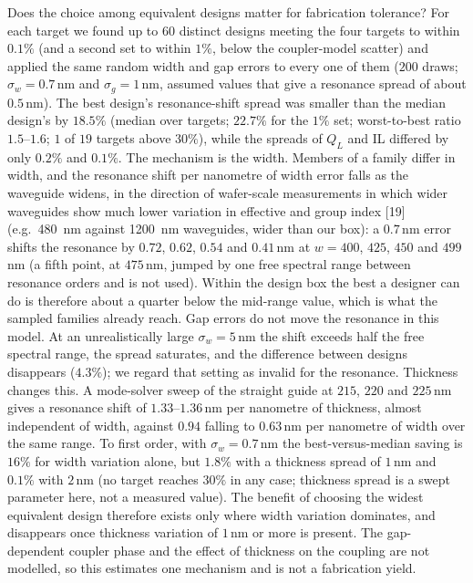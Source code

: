 \documentclass[11pt]{article}
\newcommand{\QL}{Q_L}
\begin{document}
Does the choice among equivalent designs matter for fabrication tolerance? For each target we found up to $60$ distinct designs meeting the four targets to within $0.1\%$ (and a second set to within $1\%$, below the coupler-model scatter) and applied the same random width and gap errors to every one of them ($200$ draws; $\sigma_w = 0.7$\,nm and $\sigma_g = 1$\,nm, assumed values that give a resonance spread of about $0.5$\,nm). The best design's resonance-shift spread was smaller than the median design's by $18.5\%$ (median over targets; $22.7\%$ for the $1\%$ set; worst-to-best ratio $1.5$--$1.6$; $1$ of $19$ targets above $30\%$), while the spreads of $\QL$ and IL differed by only $0.2\%$ and $0.1\%$. The mechanism is the width. Members of a family differ in width, and the resonance shift per nanometre of width error falls as the waveguide widens, in the direction of wafer-scale measurements in which wider waveguides show much lower variation in effective and group index [19] (e.g.\ \SI{480}{nm} against \SI{1200}{nm} waveguides, wider than our box): a $0.7$\,nm error shifts the resonance by $0.72$, $0.62$, $0.54$ and $0.41$\,nm at $w = 400$, $425$, $450$ and $499$\,nm (a fifth point, at $475$\,nm, jumped by one free spectral range between resonance orders and is not used). Within the design box the best a designer can do is therefore about a quarter below the mid-range value, which is what the sampled families already reach. Gap errors do not move the resonance in this model. At an unrealistically large $\sigma_w = 5$\,nm the shift exceeds half the free spectral range, the spread saturates, and the difference between designs disappears ($4.3\%$); we regard that setting as invalid for the resonance. Thickness changes this. A mode-solver sweep of the straight guide at $215$, $220$ and $225$\,nm gives a resonance shift of $1.33$--$1.36$\,nm per nanometre of thickness, almost independent of width, against $0.94$ falling to $0.63$\,nm per nanometre of width over the same range. To first order, with $\sigma_w = 0.7$\,nm the best-versus-median saving is $16\%$ for width variation alone, but $1.8\%$ with a thickness spread of $1$\,nm and $0.1\%$ with $2$\,nm (no target reaches $30\%$ in any case; thickness spread is a swept parameter here, not a measured value). The benefit of choosing the widest equivalent design therefore exists only where width variation dominates, and disappears once thickness variation of $1$\,nm or more is present. The gap-dependent coupler phase and the effect of thickness on the coupling are not modelled, so this estimates one mechanism and is not a fabrication yield.
\end{document}
